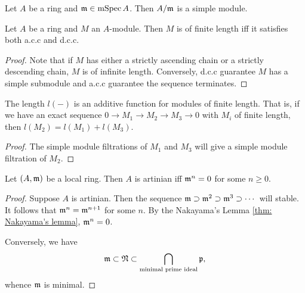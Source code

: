         \begin{example}\label{eg: A/m is a simple module}
            Let $A$ be a ring and ${\mathfrak{m}} \in \operatorname{mSpec} A$.
            Then $A/{\mathfrak{m}}$ is a simple module.
        \end{example}

        \begin{proposition}\label{prop: of finite length iff both acc and dcc}
            Let $A$ be a ring and $M$ an $A$-module.
            Then $M$ is of finite length iff it satisfies both a.c.c and d.c.c.
        \end{proposition}
        \begin{proof}
            Note that if $M$ has either a strictly ascending chain or a strictly descending chain, $M$ is of infinite length.
            Conversely, d.c.c guarantee $M$ has a simple submodule and a.c.c guarantee the sequence terminates.
        \end{proof}

        \begin{proposition}\label{prop: length is additive for modules of finite length}
            The length $l(-)$ is an additive function for modules of finite length.
            That is, if we have an exact sequence $0 \to M_1 \to M_2 \to M_3 \to 0$ with $M_i$ of finite length, then $l(M_2) = l(M_1) + l(M_3)$.
        \end{proposition}
        \begin{proof}
            The simple module filtrations of $M_1$ and $M_3$ will give a simple module filtration of $M_2$.
        \end{proof}

        \begin{proposition}\label{prop: characteristic of local artinian rings}
            Let $(A,{\mathfrak{m}})$ be a local ring.
            Then $A$ is artinian iff ${\mathfrak{m}}^n = 0$ for some $n\geq 0$.    
        \end{proposition}
        \begin{proof}
            Suppose $A$ is artinian.
            Then the sequence ${\mathfrak{m}} \supset {\mathfrak{m}}^2 \supset {\mathfrak{m}}^3 \supset \cdots$ will stable.
            It follows that ${\mathfrak{m}}^n = {\mathfrak{m}}^{n+1}$ for some $n$.
            By the Nakayama's Lemma \ref{thm: Nakayama's lemma}, ${\mathfrak{m}}^n = 0$.

            Conversely, we have 
            \[ {\mathfrak{m}} \subset {\mathfrak{N}} \subset \bigcap_{\text{minimal prime ideal}} {\mathfrak{p}},\] 
            whence ${\mathfrak{m}}$ is minimal.
        \end{proof}

